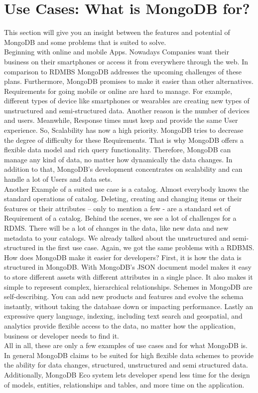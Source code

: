\section{Use Cases: What is MongoDB for?}
This section will give you an insight between the features and potential of MongoDB and some problems that is suited to solve.
\\
Beginning with online and mobile Apps. Nowadays Companies want their business on their smartphones or access it from everywhere through the web. In comparison to RDMBS MongoDB addresses the upcoming challenges of these plans. Furthermore, MongoDB promises to make it easier than other alternatives. Requirements for going mobile or online are hard to manage. For example, different types of device like smartphones or wearables are creating new types of unstructured and semi-structured data. Another reason is the number of devices and users. Meanwhile, Response times must keep and provide the same User experience. So, Scalability has now a high priority. MongoDB tries to decrease the degree of difficulty for these Requirements. That is why MongoDB offers a flexible data model and rich query functionality. Therefore, MongoDB can manage any kind of data, no matter how dynamically the data changes. In addition to that, MongoDB’s development concentrates on scalability and can handle a lot of Users and data sets\cite{MongoDBInc.2013a}.
\\
Another Example of a suited use case is a catalog. Almost everybody knows the standard operations of catalog. Deleting, creating and changing items or their features or their attributes – only to mention a few - are a standard set of Requirement of a catalog. Behind the scenes, we see a lot of challenges for a RDMS. There will be a lot of changes in the data, like new data and new metadata to your catalogs. We already talked about the unstructured and semi-structured in the first use case. Again, we got the same problems with a RDBMS. How does MongoDB make it easier for developers? First, it is how the data is structured in MongoDB. With MongoDB’s JSON document model makes it easy to store different assets with different attributes in a single place. It also makes it simple to represent complex, hierarchical relationships. Schemes in MongoDB are self-describing. You can add new products and features and evolve the schema instantly, without taking the database down or impacting performance. Lastly an expressive query language, indexing, including text search and geospatial, and analytics provide flexible access to the data, no matter how the application, business or developer needs to find it\cite{MongoDBInc.2013a}.
\\
All in all, these are only a few examples of use cases and for what MongoDB is. In general MongoDB claims to be suited for high flexible data schemes to provide the ability for data changes, structured, unstructured and semi structured data. Additionally, MongoDB Eco system lets developer spend less time for the design of models, entities, relationships and tables, and more time on the application\cite{MongoDBInc.2013a}.